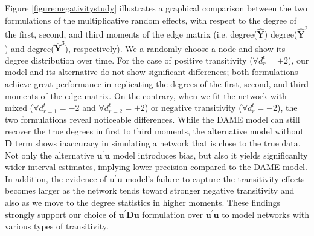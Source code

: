 \documentclass[a4paper]{article}
\begin{document}
Figure \ref{figure:negativitystudy} illustrates a graphical comparison between the two formulations of the multiplicative random effects, with respect to the degree of the first, second, and third moments of the edge matrix (i.e. degree($\hat{\mathbf{Y}}$) degree($\hat{\mathbf{Y}}^2$) and degree($\hat{\mathbf{Y}}^3$), respectively). We a randomly choose a node and show its degree distribution over time. For the case of positive transitivity ($\forall d^t_{r} =+2$), our model and its alternative do not show significant differences; both formulations achieve great performance in replicating the degrees of the first, second, and third moments of the edge matrix. On the contrary, when we fit the network with mixed ($\forall d^t_{r=1} =-2$ and $\forall d^t_{r=2} =+2$) or negative transitivity ($\forall d^t_{r} =-2$), the two formulations reveal noticeable differences. While the DAME model can still recover the true degrees in first to third moments, the alternative model without $\mathbf{D}$ term shows inaccuracy in simulating a network that is close to the true data. Not only the alternative $\boldsymbol{u}^\prime \boldsymbol{u}$ model introduces bias, but also it yields significanlty wider interval estimates, implying lower precision compared to the DAME model. In addition, the evidence of $\boldsymbol{u}^\prime \boldsymbol{u}$ model's failure to capture the transitivity effects becomes larger as the network tends toward stronger negative transitivity and also as we move to the degree statistics in higher moments. These findings strongly support our choice of $\boldsymbol{u}^\prime \mathbf{D}\boldsymbol{u}$ formulation over $\boldsymbol{u}^\prime \boldsymbol{u}$ to model networks with various types of transitivity.
\end{document}
